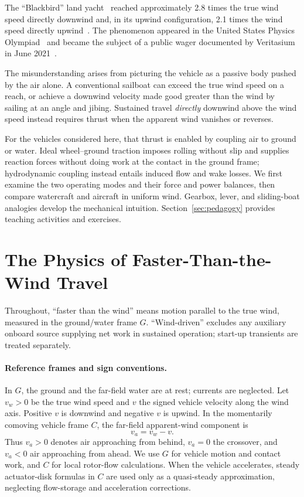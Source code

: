 \documentclass[reprint,aps,pra,longbibliography]{revtex4-2}
\begin{document}
The ``Blackbird'' land yacht~\cite{nahon-2023} reached approximately 2.8 times the true wind speed directly downwind and, in its upwind configuration, 2.1 times the wind speed directly upwind~\cite{nalsa2010}. The phenomenon appeared in the United States Physics Olympiad~\cite{AAPT2013} and became the subject of a public wager documented by Veritasium in June 2021~\cite{Veritasium2021,veritasium_2021_physics}.



The misunderstanding arises from picturing the vehicle as a passive body pushed by the air alone. A conventional sailboat can exceed the true wind speed on a reach, or achieve a downwind velocity made good greater than the wind by sailing at an angle and jibing. Sustained travel \emph{directly} downwind above the wind speed instead requires thrust when the apparent wind vanishes or reverses.

For the vehicles considered here, that thrust is enabled by coupling air to ground or water. Ideal wheel--ground traction imposes rolling without slip and supplies reaction forces without doing work at the contact in the ground frame; hydrodynamic coupling instead entails induced flow and wake losses. We first examine the two operating modes and their force and power balances, then compare watercraft and aircraft in uniform wind. Gearbox, lever, and sliding-boat analogies develop the mechanical intuition. Section~\ref{sec:pedagogy} provides teaching activities and exercises.


\section{The Physics of Faster-Than-the-Wind Travel}


Throughout, ``faster than the wind'' means motion parallel to the true wind, measured in the ground/water frame \(G\). ``Wind-driven'' excludes any auxiliary onboard source supplying net work in sustained operation; start-up transients are treated separately.

\paragraph*{Reference frames and sign conventions.}
In \(G\), the ground and the far-field water are at rest; currents are neglected. Let \(v_w>0\) be the true wind speed and \(v\) the signed vehicle velocity along the wind axis. Positive \(v\) is downwind and negative \(v\) is upwind. In the momentarily comoving vehicle frame \(C\), the far-field apparent-wind component is
\[
v_a=v_w-v.
\]
Thus \(v_a>0\) denotes air approaching from behind, \(v_a=0\) the crossover, and \(v_a<0\) air approaching from ahead. We use \(G\) for vehicle motion and contact work, and \(C\) for local rotor-flow calculations. When the vehicle accelerates, steady actuator-disk formulas in \(C\) are used only as a quasi-steady approximation, neglecting flow-storage and acceleration corrections.
\end{document}
